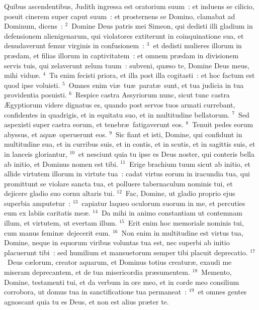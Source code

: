 \lettrine[lines=3,image=true,loversize=0.05,lraise=-0.03]{Q}{}uibus ascendentibus, Judith ingressa est oratorium suum~: et induens se cilicio, posuit cinerem super caput suum~: et prosternens se Domino, clamabat ad Dominum, dicens~:
${}^{2}$~Domine Deus patris mei Simeon, qui dedisti illi gladium in defensionem alienigenarum, qui violatores extiterunt in coinquinatione sua, et denudaverunt femur virginis in confusionem~:
${}^{3}$~et dedisti mulieres illorum in pr\ae dam, et filias illorum in captivitatem~: et omnem pr\ae dam in divisionem servis tuis, qui zelaverunt zelum tuum~: subveni, qu\ae so te, Domine Deus meus, mihi vidu\ae .
${}^{4}$~Tu enim fecisti priora, et illa post illa cogitasti~: et hoc factum est quod ipse voluisti.
${}^{5}$~Omnes enim vi\ae\ tu\ae\ parat\ae\ sunt, et tua judicia in tua providentia posuisti.
${}^{6}$~Respice castra Assyriorum nunc, sicut tunc castra \AE gyptiorum videre dignatus es, quando post servos tuos armati currebant, confidentes in quadrigis, et in equitatu suo, et in multitudine bellatorum.
${}^{7}$~Sed aspexisti super castra eorum, et tenebr\ae\ fatigaverunt eos.
${}^{8}$~Tenuit pedes eorum abyssus, et aqu\ae\ operuerunt eos.
${}^{9}$~Sic fiant et isti, Domine, qui confidunt in multitudine sua, et in curribus suis, et in contis, et in scutis, et in sagittis suis, et in lanceis gloriantur,
${}^{10}$~et nesciunt quia tu ipse es Deus noster, qui conteris bella ab initio, et Dominus nomen est tibi.
${}^{11}$~Erige brachium tuum sicut ab initio, et allide virtutem illorum in virtute tua~: cadat virtus eorum in iracundia tua, qui promittunt se violare sancta tua, et polluere tabernaculum nominis tui, et dejicere gladio suo cornu altaris tui.
${}^{12}$~Fac, Domine, ut gladio proprio ejus superbia amputetur~:
${}^{13}$~capiatur laqueo oculorum suorum in me, et percuties eum ex labiis caritatis me\ae .
${}^{14}$~Da mihi in animo constantiam ut contemnam illum, et virtutem, ut evertam illum.
${}^{15}$~Erit enim hoc memoriale nominis tui, cum manus femin\ae\ dejecerit eum.
${}^{16}$~Non enim in multitudine est virtus tua, Domine, neque in equorum viribus voluntas tua est, nec superbi ab initio placuerunt tibi~: sed humilium et mansuetorum semper tibi placuit deprecatio.
${}^{17}$~Deus c\ae lorum, creator aquarum, et Dominus totius creatur\ae , exaudi me miseram deprecantem, et de tua misericordia pr\ae sumentem.
${}^{18}$~Memento, Domine, testamenti tui, et da verbum in ore meo, et in corde meo consilium corrobora, ut domus tua in sanctificatione tua permaneat~:
${}^{19}$~et omnes gentes agnoscant quia tu es Deus, et non est alius pr\ae ter te.

